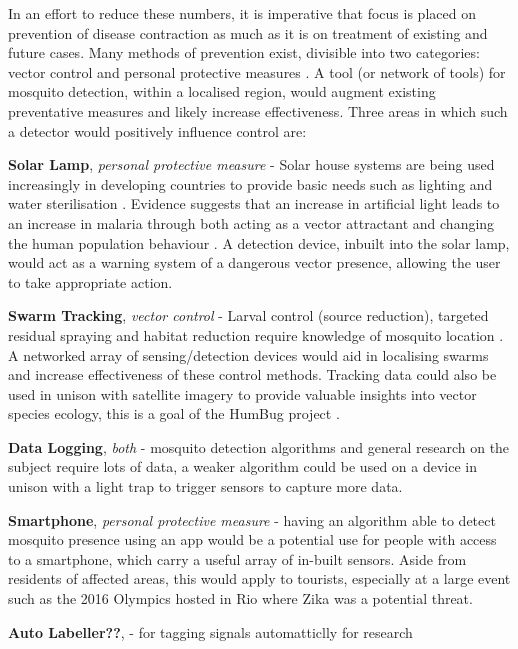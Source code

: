         In an effort to reduce these numbers, it is imperative that focus is placed on prevention of disease contraction as much as it is on treatment of existing and future cases. Many methods of prevention exist, divisible into two categories: vector control and personal protective measures \cite{Caraballo2014}. A tool (or network of tools) for mosquito detection, within a localised region, would augment existing preventative measures and likely increase effectiveness. Three areas in which such a detector would positively influence control are:
        \begin{sitemize}
            \item{\textbf{Solar Lamp}, \textit{personal protective measure} - Solar house systems are being used increasingly in developing countries to provide basic needs such as lighting and water sterilisation \cite{Akikur2013}. Evidence suggests that an increase in artificial light leads to an increase in malaria through both acting as a vector attractant and changing the human population behaviour \cite{Barghini2010}. A detection device, inbuilt into the solar lamp, would act as a warning system of a dangerous vector presence, allowing the user to take appropriate action.}
            \item{\textbf{Swarm Tracking}, \textit{vector control} - Larval control (source reduction), targeted residual spraying and habitat reduction require knowledge of mosquito location \cite{Caraballo2014,Pates2005,WHOVectorControl2016}. A networked array of sensing/detection devices would aid in localising swarms and increase effectiveness of these control methods. Tracking data could also be used in unison with satellite imagery to provide valuable insights into vector species ecology, this is a goal of the HumBug project \cite{HumBug2016}.}
            \item{\textbf{Data Logging}, \textit{both} - mosquito detection algorithms and general research on the subject require lots of data, a weaker algorithm could be used on a device in unison with a light trap to trigger sensors to capture more data.}
            \item{\textbf{Smartphone}, \textit{personal protective measure} - having an algorithm able to detect mosquito presence using an app would be a potential use for people with access to a smartphone, which carry a useful array of in-built sensors. Aside from residents of affected areas, this would apply to tourists, especially at a large event such as the 2016 Olympics hosted in Rio where Zika was a potential threat.}
            \item{\textbf{Auto Labeller??}, \textit{} - for tagging signals automatticlly for research}
        \end{sitemize}
